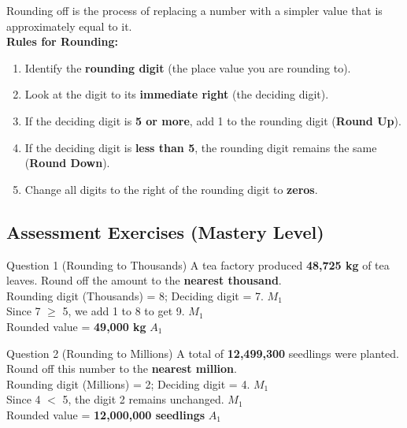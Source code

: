 \documentclass[12pt, a4paper, oneside]{article}
\begin{document}
\begin{tcolorbox}[colback=lightgrey, colframe=primaryblue, title=\textbf{Concept Summary}, arc=5pt]
    Rounding off is the process of replacing a number with a simpler value that is approximately equal to it. \\
    
    \textbf{Rules for Rounding:}
    \begin{enumerate}
        \item Identify the \textbf{rounding digit} (the place value you are rounding to).
        \item Look at the digit to its \textbf{immediate right} (the deciding digit).
        \item If the deciding digit is \textbf{5 or more}, add 1 to the rounding digit (\textbf{Round Up}).
        \item If the deciding digit is \textbf{less than 5}, the rounding digit remains the same (\textbf{Round Down}).
        \item Change all digits to the right of the rounding digit to \textbf{zeros}.
    \end{enumerate}
\end{tcolorbox}

\subsection*{Assessment Exercises (Mastery Level)}

\begin{solvingbox}{Question 1 (Rounding to Thousands)}
A tea factory produced \textbf{48,725 kg} of tea leaves. Round off the amount to the \textbf{nearest thousand}. \\
Rounding digit (Thousands) = 8; Deciding digit = 7. \hfill $M_1$ \\
Since 7 $\ge$ 5, we add 1 to 8 to get 9. \hfill $M_1$ \\
Rounded value = \textbf{49,000 kg} \hfill $A_1$
\end{solvingbox}

\begin{solvingbox}{Question 2 (Rounding to Millions)}
A total of \textbf{12,499,300} seedlings were planted. Round off this number to the \textbf{nearest million}. \\
Rounding digit (Millions) = 2; Deciding digit = 4. \hfill $M_1$ \\
Since 4 $<$ 5, the digit 2 remains unchanged. \hfill $M_1$ \\
Rounded value = \textbf{12,000,000 seedlings} \hfill $A_1$
\end{solvingbox}
\end{document}
